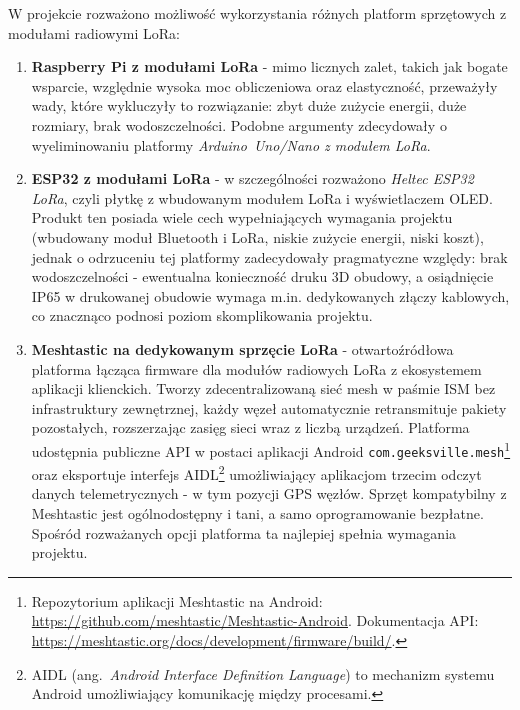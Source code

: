 W projekcie rozważono możliwość wykorzystania różnych platform sprzętowych z modułami radiowymi LoRa:
\begin{enumerate}
    \item \textbf{Raspberry Pi z modułami LoRa} - mimo licznych zalet, takich jak bogate wsparcie,
          względnie wysoka moc obliczeniowa oraz elastyczność, przeważyły wady, które wykluczyły to
          rozwiązanie: zbyt duże zużycie energii, duże rozmiary, brak wodoszczelności. Podobne
          argumenty zdecydowały o wyeliminowaniu platformy \textit{Arduino~Uno/Nano z modułem LoRa}.
    \item \textbf{ESP32 z modułami LoRa} - w szczególności rozważono \textit{Heltec ESP32 LoRa},
          czyli płytkę z wbudowanym modułem LoRa i wyświetlaczem OLED. Produkt ten posiada wiele
          cech wypełniających wymagania projektu (wbudowany moduł Bluetooth i LoRa, niskie zużycie
          energii, niski koszt), jednak o odrzuceniu tej platformy zadecydowały pragmatyczne względy: 
          brak wodoszczelności - ewentualna konieczność druku 3D obudowy, a osiądnięcie IP65 w drukowanej 
          obudowie wymaga m.in. dedykowanych złączy kablowych, co znacznąco podnosi poziom skomplikowania projektu.
    \item \textbf{Meshtastic na dedykowanym sprzęcie LoRa} - otwartoźródłowa platforma łącząca
          firmware dla modułów radiowych LoRa z ekosystemem aplikacji klienckich. Tworzy
          zdecentralizowaną sieć mesh w paśmie ISM bez infrastruktury zewnętrznej, każdy węzeł
          automatycznie retransmituje pakiety pozostałych, rozszerzając zasięg sieci wraz
          z liczbą urządzeń. Platforma udostępnia publiczne API w postaci aplikacji Android
          \texttt{com.geeksville.mesh}\footnote{Repozytorium aplikacji Meshtastic na Android:
          \url{https://github.com/meshtastic/Meshtastic-Android}. Dokumentacja API:
          \url{https://meshtastic.org/docs/development/firmware/build/}.} oraz eksportuje 
          interfejs AIDL\footnote{AIDL (ang.\ \textit{Android Interface Definition Language}) to mechanizm
          systemu Android umożliwiający komunikację między procesami.} umożliwiający aplikacjom
          trzecim odczyt danych telemetrycznych - w tym pozycji GPS węzłów.
          Sprzęt kompatybilny z Meshtastic jest ogólnodostępny i tani, a samo oprogramowanie
          bezpłatne. Spośród rozważanych opcji platforma ta najlepiej spełnia wymagania projektu.
\end{enumerate}

